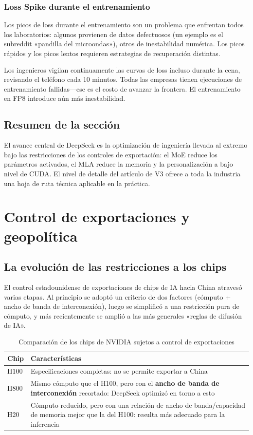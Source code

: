\documentclass[a4paper]{article}
\begin{document}
\subsubsection{Loss Spike durante el entrenamiento}

Los picos de loss durante el entrenamiento son un problema que enfrentan todos los laboratorios: algunos provienen de datos defectuosos (un ejemplo es el subreddit «pandilla del microondas»), otros de inestabilidad numérica. Los picos rápidos y los picos lentos requieren estrategias de recuperación distintas.

Los ingenieros vigilan continuamente las curvas de loss incluso durante la cena, revisando el teléfono cada 10 minutos. Todas las empresas tienen ejecuciones de entrenamiento fallidas—ese es el costo de avanzar la frontera. El entrenamiento en FP8 introduce aún más inestabilidad.

\subsection{Resumen de la sección}

El avance central de DeepSeek es la optimización de ingeniería llevada al extremo bajo las restricciones de los controles de exportación: el MoE reduce los parámetros activados, el MLA reduce la memoria y la personalización a bajo nivel de CUDA. El nivel de detalle del artículo de V3 ofrece a toda la industria una hoja de ruta técnica aplicable en la práctica.
\section{Control de exportaciones y geopolítica}

\subsection{La evolución de las restricciones a los chips}

El control estadounidense de exportaciones de chips de IA hacia China atravesó varias etapas. Al principio se adoptó un criterio de dos factores (cómputo + ancho de banda de interconexión), luego se simplificó a una restricción pura de cómputo, y más recientemente se amplió a las más generales «reglas de difusión de IA».

\begin{table}[H]
\centering
\begin{tabular}{lp{8cm}}
\toprule
\textbf{Chip} & \textbf{Características} \\
\midrule
H100 & Especificaciones completas: no se permite exportar a China \\
H800 & Mismo cómputo que el H100, pero con el \textbf{ancho de banda de interconexión} recortado: DeepSeek optimizó en torno a esto \\
H20 & Cómputo reducido, pero con una relación de ancho de banda/capacidad de memoria mejor que la del H100: resulta más adecuado para la inferencia \\
\bottomrule
\end{tabular}
\caption{Comparación de los chips de NVIDIA sujetos a control de exportaciones}
\end{table}
\end{document}

